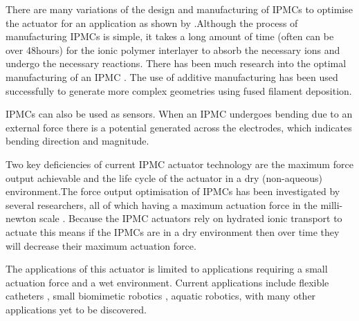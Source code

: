 There are many variations of the design and manufacturing of IPMCs to optimise the actuator for an application as shown by \cite{Shahinpoor2016}.Although the process of manufacturing IPMCs is simple, it takes a long amount of time (often can be over 48hours\citep{Ma2020}) for the ionic polymer interlayer to absorb the necessary ions and undergo the necessary reactions. There has been much research into the optimal manufacturing of an IPMC \citep{HOMMA1999,Liu1992,Shahinpoor2016}. The use of additive manufacturing has been used successfully to generate more complex geometries using fused filament deposition\citep{Carrico2015}.

IPMCs can also be used as sensors. When an IPMC undergoes bending due to an external force there is a potential generated across the electrodes, which indicates bending direction and magnitude\citep{Shahinpoor2004}.

Two key deficiencies of current IPMC actuator technology are the maximum force output achievable and the life cycle of the actuator in a dry (non-aqueous) environment.The force output optimisation of IPMCs has been investigated by several researchers, all of which having a maximum actuation force in the milli-newton scale \citep{Akle2004,Xu2014,Shahinpoor2004}. 
Because the IPMC actuators rely on hydrated ionic transport to actuate this means if the IPMCs are in a dry environment then over time they will decrease their maximum actuation force.

The applications of this actuator is limited to applications requiring a small actuation force and a wet environment. Current applications include flexible catheters \citep{Guo1994}, small biomimetic robotics \citep{Kodaira2019,Chang2013}, aquatic robotics\citep{Hubbard2014,Khawwaf2019}, with many other applications yet to be discovered.

